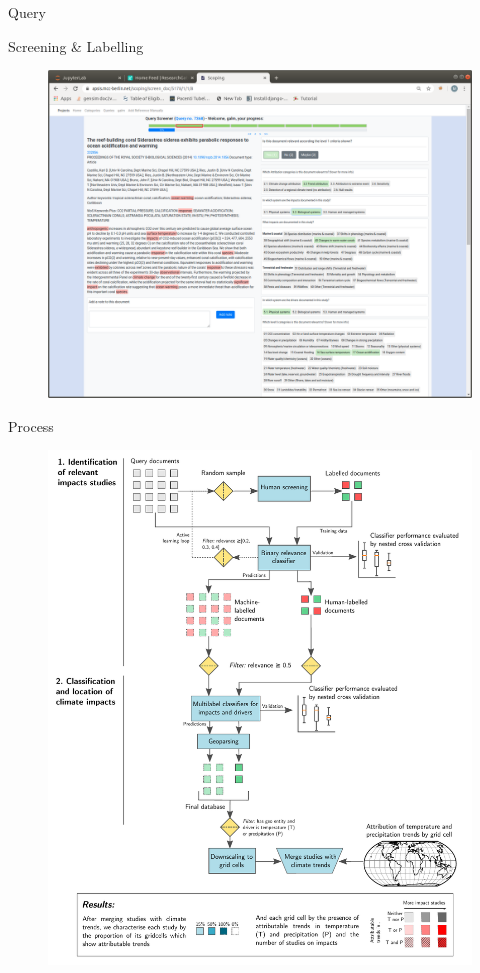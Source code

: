 \documentclass[9pt]{beamer}
\begin{document}
\begin{frame}{Query}
\end{frame}

\begin{frame}{Screening \& Labelling}

\begin{figure}
	\includegraphics[width=\linewidth]{../plots/screening-platform}
\end{figure}

\end{frame}

\begin{frame}{Process}
\begin{figure}
	\includegraphics[width=0.65\linewidth]{../figures/process.pdf}
\end{figure}
\end{frame}
\end{document}
